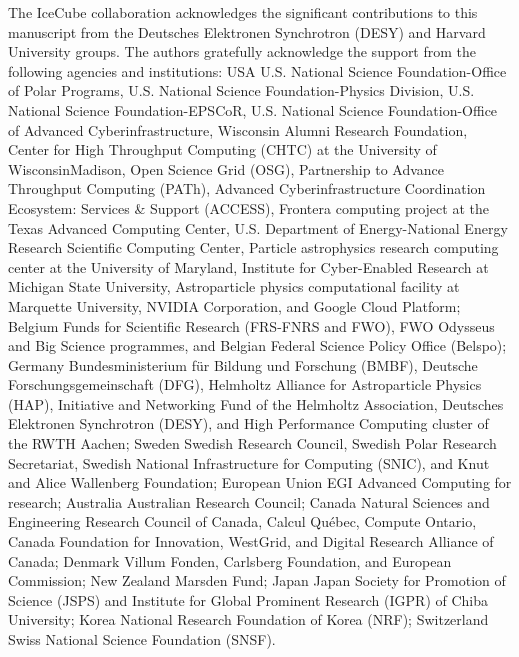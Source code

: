 \documentclass[
    aps,
    prd,
    reprint,
    amsmath,
    amssymb,
    nofootinbib,
    superscriptaddress,
    floatfix
]{revtex4-2}
\begin{document}

\begin{acknowledgements}

The IceCube collaboration acknowledges the significant contributions to this manuscript from the Deutsches Elektronen Synchrotron (DESY) and Harvard University groups.
The authors gratefully acknowledge the support from the following agencies and institutions:
USA {\textendash} U.S. National Science Foundation-Office of Polar Programs,
U.S. National Science Foundation-Physics Division,
U.S. National Science Foundation-EPSCoR,
U.S. National Science Foundation-Office of Advanced Cyberinfrastructure,
Wisconsin Alumni Research Foundation,
Center for High Throughput Computing (CHTC) at the University of Wisconsin{\textendash}Madison,
Open Science Grid (OSG),
Partnership to Advance Throughput Computing (PATh),
Advanced Cyberinfrastructure Coordination Ecosystem: Services {\&} Support (ACCESS),
Frontera computing project at the Texas Advanced Computing Center,
U.S. Department of Energy-National Energy Research Scientific Computing Center,
Particle astrophysics research computing center at the University of Maryland,
Institute for Cyber-Enabled Research at Michigan State University,
Astroparticle physics computational facility at Marquette University,
NVIDIA Corporation,
and Google Cloud Platform;
Belgium {\textendash} Funds for Scientific Research (FRS-FNRS and FWO),
FWO Odysseus and Big Science programmes,
and Belgian Federal Science Policy Office (Belspo);
Germany {\textendash} Bundesministerium f{\"u}r Bildung und Forschung (BMBF),
Deutsche Forschungsgemeinschaft (DFG),
Helmholtz Alliance for Astroparticle Physics (HAP),
Initiative and Networking Fund of the Helmholtz Association,
Deutsches Elektronen Synchrotron (DESY),
and High Performance Computing cluster of the RWTH Aachen;
Sweden {\textendash} Swedish Research Council,
Swedish Polar Research Secretariat,
Swedish National Infrastructure for Computing (SNIC),
and Knut and Alice Wallenberg Foundation;
European Union {\textendash} EGI Advanced Computing for research;
Australia {\textendash} Australian Research Council;
Canada {\textendash} Natural Sciences and Engineering Research Council of Canada,
Calcul Qu{\'e}bec, Compute Ontario, Canada Foundation for Innovation, WestGrid, and Digital Research Alliance of Canada;
Denmark {\textendash} Villum Fonden, Carlsberg Foundation, and European Commission;
New Zealand {\textendash} Marsden Fund;
Japan {\textendash} Japan Society for Promotion of Science (JSPS)
and Institute for Global Prominent Research (IGPR) of Chiba University;
Korea {\textendash} National Research Foundation of Korea (NRF);
Switzerland {\textendash} Swiss National Science Foundation (SNSF).

\end{acknowledgements}
\end{document}
